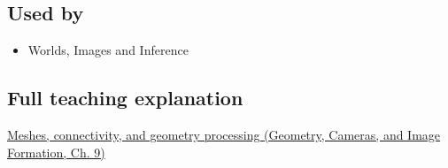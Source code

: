 \subsection{Used by}\label{appendix-1dd4ad54ca57-used-by}

\hypertarget{appendix-1dd4ad54ca57-used-by}{}

\begin{itemize}
\tightlist
\item
  {Worlds, Images and Inference}
\end{itemize}

\subsection{Full teaching explanation}\label{appendix-1dd4ad54ca57-full-teaching-explanation}

\hypertarget{appendix-1dd4ad54ca57-full-teaching-explanation}{}

\href{../03-Geometry-Cameras-and-Image-Formation/main.pdf\#nameddest=03-visual-computing-i-ch002-meshes-connectivity-and-geometry-processing}{Meshes, connectivity, and geometry processing (Geometry, Cameras, and Image Formation, Ch. 9)}
